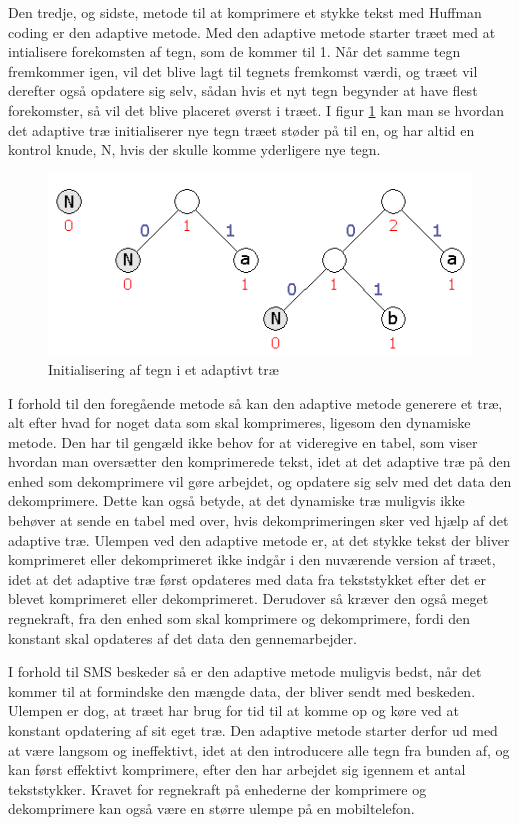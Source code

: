 Den tredje, og sidste, metode til at komprimere et stykke tekst med Huffman coding er den adaptive metode. Med den adaptive metode starter træet med at intialisere forekomsten af tegn, som de kommer til 1. Når det samme tegn fremkommer igen, vil det blive lagt til tegnets fremkomst værdi, og træet vil derefter også opdatere sig selv, sådan hvis et nyt tegn begynder at have flest forekomster, så vil det blive placeret øverst i træet. I figur \ref{fig:adaptive_tree} kan man se hvordan det adaptive træ initialiserer nye tegn træet støder på til en, og har altid en kontrol knude, N, hvis der skulle komme yderligere nye tegn.

\begin{figure}[H]
\centering
\includegraphics[width=\linewidth]{Billeder/adaptivt.png}
\caption{Initialisering af tegn i et adaptivt træ \cite{Hufftree_1}}
\label{fig:adaptive_tree}
\end{figure}

I forhold til den foregående metode så kan den adaptive metode generere et træ, alt efter hvad for noget data som skal komprimeres, ligesom den dynamiske metode. Den har til gengæld ikke behov for at videregive en tabel, som viser hvordan man oversætter den komprimerede tekst, idet at det adaptive træ på den enhed som dekomprimere vil gøre arbejdet, og opdatere sig selv med det data den dekomprimere. Dette kan også betyde, at det dynamiske træ muligvis ikke behøver at sende en tabel med over, hvis dekomprimeringen sker ved hjælp af det adaptive træ. Ulempen ved den adaptive metode er, at det stykke tekst der bliver komprimeret eller dekomprimeret ikke indgår i den nuværende version af træet, idet at det adaptive træ først opdateres med data fra tekststykket efter det er blevet komprimeret eller dekomprimeret. Derudover så kræver den også meget regnekraft, fra den enhed som skal komprimere og dekomprimere, fordi den konstant skal opdateres af det data den gennemarbejder. \cite{Hufftree_5}

I forhold til SMS beskeder så er den adaptive metode muligvis bedst, når det kommer til at formindske den mængde data, der bliver sendt med beskeden. Ulempen er dog, at træet har brug for tid til at komme op og køre ved at konstant opdatering af sit eget træ. Den adaptive metode starter derfor ud med at være langsom og ineffektivt, idet at den introducere alle tegn fra bunden af, og kan først effektivt komprimere, efter den har arbejdet sig igennem et antal tekststykker. Kravet for regnekraft på enhederne der komprimere og dekomprimere kan også være en større ulempe på en mobiltelefon.
